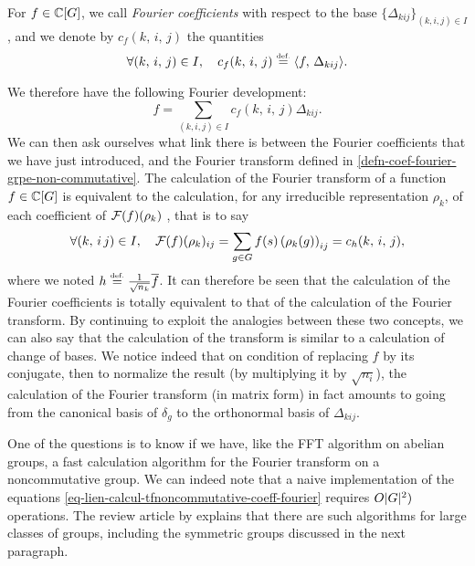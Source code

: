 \begin{defn}
  \label{notation-97} For $ f \in \CC [G] $, we call \textit{Fourier coefficients} with respect to the base $ \{\Delta_{kij}\}_{(k, i, j) \in I} $, and we denote by $ c_{f} (k, \, i, \, j) $ the quantities
\begin{equation*}
\forall (k, \, i, \, j) \in I, \quad c_{f} (k, \, i, \, j) \eqdef \dotp{f}{\Delta_{kij}}.
\end{equation*}
\end{defn}
We therefore have the following Fourier development:
\begin{equation*}
f = \sum_{(k, i, j) \in I}{c_{f} (k, \, i, \, j) \Delta_{kij}}.
\end{equation*}
We can then ask ourselves what link there is between the Fourier coefficients that we have just introduced, and the Fourier transform defined in \ref{defn-coef-fourier-grpe-non-commutative}. The calculation of the Fourier transform of a function $ f \in \CC [G] $ is equivalent to the calculation, for any irreducible representation $ \rho_k $, of each coefficient of $ \Ff(f) (\rho_k) $ , that is to say
\begin{equation}
\label{eq-lien-calcul-tfnoncommutative-coeff-fourier}
\forall (k, \, i \, j) \in I, \quad \Ff(f) (\rho_k)_{ij} = \sum_{g \in G}{f(s) \left(\rho_k (g) \right)_{ij}} = c_{h} (k, \, i, \, j),
\end{equation}
where we noted $ h \eqdef \frac{1}{\sqrt{n_k}} \ol{f} $. It can therefore be seen that the calculation of the Fourier coefficients is totally equivalent to that of the calculation of the Fourier transform. By continuing to exploit the analogies between these two concepts, we can also say that the calculation of the transform is similar to a calculation of change of bases. We notice indeed that on condition of replacing $ f $ by its conjugate, then to normalize the result (by multiplying it by $ \sqrt{n_i} $), the calculation of the Fourier transform (in matrix form) in fact amounts to going from the canonical basis of $ \delta_g $ to the orthonormal basis of $ \Delta_{kij} $.
 
 
One of the questions is to know if we have, like the FFT algorithm on abelian groups, a fast calculation algorithm for the Fourier transform on a noncommutative group. We can indeed note that a naive implementation of the equations \eqref{eq-lien-calcul-tfnoncommutative-coeff-fourier} requires $ \grdo (|G|^2) $ operations. The review article by  \cite{rockmore-generalized} explains that there are such algorithms for large classes of groups, including the symmetric groups discussed in the next paragraph.
